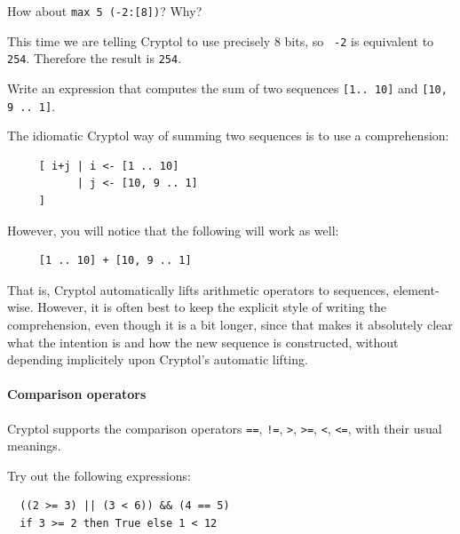 \begin{Exercise}\label{ex:arith:6}
How about {\tt max 5 (-2:[8])}? Why?\indMin\indModular\indUnaryMinus
\end{Exercise}
\begin{Answer}
  This time we are telling Cryptol to use precisely 8 bits, so {\tt
    -2} is equivalent to {\tt 254}. Therefore the result is {\tt 254}.
\end{Answer}

\begin{Exercise}\label{ex:arith:7}
  Write an expression that computes the sum of two sequences
  \texttt{[1..\ 10]} and \texttt{[10, 9 ..\ 1]}.\indPlus
\end{Exercise}
\begin{Answer}
  The idiomatic Cryptol way of summing two sequences is to use a
  comprehension:\indComp
\begin{Verbatim}
     [ i+j | i <- [1 .. 10]
           | j <- [10, 9 .. 1]
     ]
\end{Verbatim}
However, you will notice that the following will work as well:
\begin{Verbatim}
     [1 .. 10] + [10, 9 .. 1]
\end{Verbatim}
That is, Cryptol automatically lifts arithmetic operators to
sequences, element-wise. However, it is often best to keep the
explicit style of writing the comprehension, even though it is a bit
longer, since that makes it absolutely clear what the intention is and
how the new sequence is constructed, without depending implicitely
upon Cryptol's automatic lifting.\indArithLift
\end{Answer}

\paragraph*{Comparison operators} Cryptol supports the comparison
operators {\tt ==}, {\tt !=}, {\tt >}, {\tt >=}, {\tt <}, {\tt <=},
with their usual meanings.\indEq\indNeq\indGt\indGte\indLt\indLte

\begin{Exercise}\label{ex:arith:8}
Try out the following expressions:
\begin{Verbatim}
  ((2 >= 3) || (3 < 6)) && (4 == 5)
  if 3 >= 2 then True else 1 < 12
\end{Verbatim}
\end{Exercise}

